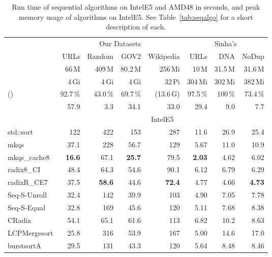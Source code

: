 \documentclass[a4paper]{myjournal}
\begin{document}
\begin{table}[p]\centering\small
\caption{Run time of sequential algorithms on IntelE5 and AMD48 in seconds, and peak memory usage of algorithms on IntelE5. See Table~\ref{tab:seqalgo} for a short description of each.}\label{tab:seqalgo-results1}
\def\tabcolsep{6pt}
\begin{tabular}{l|rrrr*{3}{r}|}
                    & \multicolumn{4}{c|}{Our Datasets} & \multicolumn{3}{c|}{Sinha's} \\
                    & URLs     & Random   & GOV2     & \multicolumn{1}{r|}{Wikipedia} & URLs     & DNA     & NoDup    \\ \hline
                 & 66\,M    & 409\,M   & 80.2\,M  & 256\,Mi   & 10\,M    & 31.5\,M & 31.6\,M  \\
                 & 4\,Gi    & 4\,Gi    & 4\,Gi    & 32\,Pi    & 304\,Mi  & 302\,Mi & 382\,Mi  \\
 ()       & 92.7\,\% & 43.0\,\% & 69.7\,\% & (13.6\,G) & 97.5\,\% & 100\,\% & 73.4\,\% \\
             & 57.9     & 3.3      & 34.1     & 33.0      & 29.4     & 9.0     & 7.7      \\ \hline
& \multicolumn{7}{c|}{IntelE5} \\ \cline{2-8}
std::sort &      122 &      422 &      153 &      287 &     11.6 &     26.9 &     25.4 \\
            mkqs &     37.1 &      228 &     56.7 &      129 &     5.67 &     11.0 &     10.9 \\
    mkqs\_cache8 & \bf 16.6 &     67.1 & \bf 25.7 &     79.5 & \bf 2.03 &     4.62 &     6.02 \\
      radix8\_CI &     48.4 &     64.3 &     54.6 &     90.1 &     6.12 &     6.79 &     6.29 \\
     radixR\_CE7 &     37.5 & \bf 58.6 &     44.6 & \bf 72.4 &     4.77 &     4.66 & \bf 4.73 \\
Seq-S-Unroll &     32.4 &      142 &     39.9 &      103 &     4.90 &     7.05 &     7.78 \\
 Seq-S-Equal &     32.8 &      169 &     45.6 &      120 &     5.11 &     7.68 &     8.38 \\
          CRadix &     54.1 &     65.1 &     61.6 &      113 &     6.82 &     10.2 &     8.63 \\
    LCPMergesort &     25.8 &      316 &     53.9 &      167 &     5.00 &     14.6 &     17.0 \\
      burstsortA &     29.5 &      131 &     43.3 &      120 &     5.64 &     8.48 &     8.46 \\

\end{tabular}
\end{table}
\end{document}
